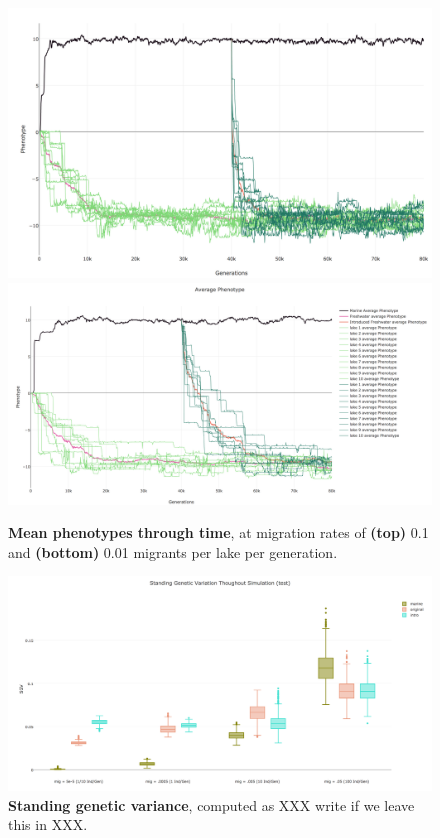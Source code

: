 \documentclass{article}
\begin{document}
\begin{figure}
	\begin{center}
        \includegraphics[width=1.0\linewidth]{plotlyPlots/PhenotypeThroughout5e-4.png}
        \includegraphics[width=1.0\linewidth]{plotlyPlots/PhenotypeThroughout5e-5.png}
  		\caption{
            \textbf{Mean phenotypes through time},
            at migration rates of
            \textbf{(top)} 0.1 and
            \textbf{(bottom)} 0.01 migrants per lake per generation.
		}
  		\label{fig:pheno_by_time2}
	\end{center}
\end{figure}

\begin{figure}
	\begin{center}
        \includegraphics[width=1.0\linewidth]{plotlyPlots/StandingGeneticVariation.png}
  		\caption{
            \textbf{Standing genetic variance},
            computed as XXX write if we leave this in XXX.
		}
  		\label{fig:pheno_by_time2}
	\end{center}
\end{figure}
\end{document}
